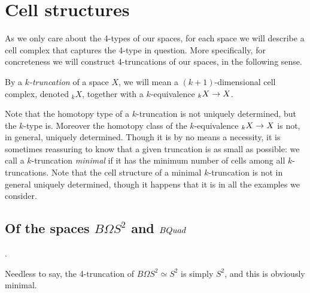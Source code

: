 \documentclass{amsart}
\begin{document}


\section{Cell structures}


As we only care about the 4-types of our spaces, for each space we will describe a cell complex that captures the 4-type in question.  More specifically, for concreteness we will construct 4-truncations of our spaces, in the following sense.

\begin{definition}
By a \emph{$k$-truncation} of a space $X$, we will mean a $(k+1)$-dimensional cell complex, denoted $_k X$, together with a $k$-equivalence $_{k} X \rightarrow X$.
\end{definition}
\nid Note that the homotopy type of a $k$-truncation is not uniquely determined, but the $k$-type is.  Moreover the homotopy class of the $k$-equivalence $_k X \rightarrow X$ is not, in general, uniquely determined.  Though it is by no means a necessity, it is sometimes reassuring to know that a given truncation is as small as possible: we call a $k$-truncation \emph{minimal} if it has the minimum number of cells among all $k$-truncations.  Note that the cell structure of a minimal $k$-truncation is not in general uniquely determined, though it happens that it is in all the examples we consider.


\subsection{Of the spaces $B\Omega S^2$ and $BQuad$}.

Needless to say, the 4-truncation of $B\Omega S^2 \simeq S^2$ is simply $S^2$, and this is obviously minimal.
\end{document}

